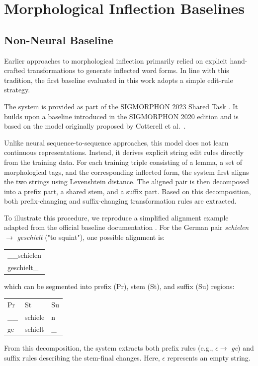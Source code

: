 \section{Morphological Inflection Baselines}

\subsection{Non-Neural Baseline}
\label{sec:background-nonneural-baseline}

Earlier approaches to morphological inflection primarily relied on explicit hand-crafted transformations to generate inflected word forms. In line with this tradition, the first baseline evaluated in this work adopts a simple edit-rule strategy.

The system is provided as part of the SIGMORPHON 2023 Shared Task \parencite{goldman-etal-2023-sigmorphon}. It builds upon a baseline introduced in the SIGMORPHON 2020 edition \parencite{vylomova-etal-2020-sigmorphon} and is based on the model originally proposed by Cotterell et al.~\parencite*{cotterell-etal-2017-conll}.

Unlike neural sequence-to-sequence approaches, this model does not learn continuous representations. Instead, it derives explicit string edit rules directly from the training data. For each training triple consisting of a lemma, a set of morphological tags, and the corresponding inflected form, the system first aligns the two strings using Levenshtein distance. The aligned pair is then decomposed into a prefix part, a shared stem, and a suffix part. Based on this decomposition, both prefix-changing and suffix-changing transformation rules are extracted.

To illustrate this procedure, we reproduce a simplified alignment example adapted from the official baseline documentation \parencite{vylomova-etal-2020-sigmorphon}. For the German pair \textit{schielen} $\rightarrow$ \textit{geschielt} ("to squint"), one possible alignment is:
\begin{center}
\ttfamily
\begin{tabular}{@{}l@{}}
\_\_schielen\\
geschielt\_\\
\end{tabular}
\end{center}
which can be segmented into prefix (Pr), stem (St), and suffix (Su) regions:
\begin{center}
\ttfamily
\begin{tabular}{@{}lll@{}}
Pr & St & Su\\
\_\_ & schiele & n\\
ge & schielt & \_\\
\end{tabular}
\end{center}
From this decomposition, the system extracts both prefix rules (e.g., $\epsilon \rightarrow$ \textit{ge}) and suffix rules describing the stem-final changes. Here, $\epsilon$ represents an empty string. 

